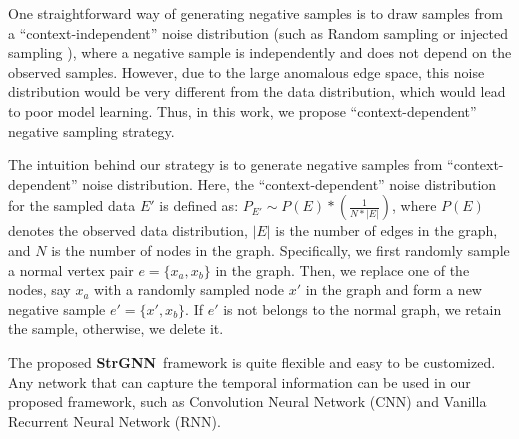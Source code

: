 \documentclass{article}
\newcommand{\nop}[1]{}
\newcommand{\model}{\textbf{StrGNN}~}
\newcommand{\modele}{\textbf{StrGNN}}
\begin{document}
One straightforward way of generating negative samples is to draw samples from a ``context-independent'' noise distribution (such as Random sampling or injected sampling \cite{akoglu2015graph}), where a negative sample is independently and does not depend on the observed samples. %
However, due to the large anomalous edge space, this noise distribution would be very different from the data distribution, which would lead to poor model learning. Thus, in this work, we propose ``context-dependent'' negative sampling strategy. %

The intuition behind our strategy is to generate negative samples from ``context-dependent'' noise distribution. Here, the ``context-dependent'' noise distribution for the sampled data $E'$ is defined as: $P_{E'} \sim P(E)*(\frac{1}{N*|E|})$, where $P(E)$ denotes the observed data distribution, $|E|$ is the number of edges in the graph, and $N$ is the number of nodes in the graph. Specifically, we first randomly sample a normal vertex pair $ e= \{x_a,x_b\}$ in the graph. Then, we replace one of the nodes, say $x_a$ with a randomly sampled node $x'$ in the graph and form a new negative sample $e' = \{x',x_b\}$. If $e'$ is not belongs to the normal graph, we retain the sample, otherwise, we delete it. 

The proposed \model framework is quite flexible and easy to be customized. Any network that can capture the temporal information can be used in our proposed framework, such as Convolution Neural Network (CNN) and Vanilla Recurrent Neural Network (RNN). 



\nop{
\begin{algorithm}[t]
	\caption{\modele: Structural Graph Neural Networks for Anomaly Detection in Dynamic Graphs}\label{algo:train}
	\begin{algorithmic}[1]
		\floatname{algorithm}{Algorithm}
		\renewcommand{\algorithmicrequire}{\textbf{Input:}}
		\renewcommand{\algorithmicensure}{\textbf{Output:}}
		\algnewcommand\AND{\textbf{and }}
		
		\Require $\{G(t)=\{V(t), E(t)\}\}_{t=1}^n$, the number of hops $h$, and window size $w$. 
		
		\State Inject anomalous edges if required;
		\State Extract $h$-hop enclosing subgraphs based on Definition 2;
		\State Generate the label for each node in the subgraph using Equation \ref{eq: label};
		\State Extract the graph structure features;
		\State Model the temporal information using GRU;
		\State Train the classifier using Equation \ref{eq:loss}.
		
	\end{algorithmic}
\end{algorithm}
}
\end{document}
